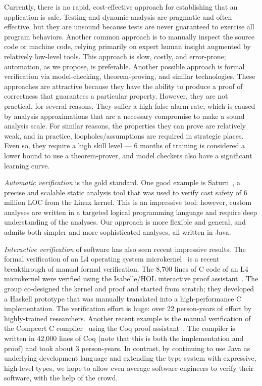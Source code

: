 \documentclass{sig-alternate}
\begin{document}
Currently, there is no rapid, cost-effective approach for establishing that
an application is safe.  Testing and dynamic analysis are pragmatic and
often effective, but they are unsound because tests are never guaranteed
to exercise all program behaviors.
Another common approach is to manually inspect the source code
or machine code, relying primarily on expert human insight augmented by
relatively low-level tools.  This approach is slow, costly, and
error-prone; automation, as we propose, is preferable.  Another possible
approach is formal verification via model-checking, theorem-proving, and
similar technologies.  These approaches are attractive because they have
the ability to produce a proof of correctness that guarantees a particular
property.  However, they are not practical, for several reasons.  They
suffer a high false alarm rate, which is caused by analysis approximations
that are a necessary compromise to make a sound analysis scale.  For
similar reasons, the properties they can prove are relatively weak, and in
practice, loopholes/assumptions are required in strategic places.  Even so, they
require a high skill level --- 6 months of training is considered a lower
bound to use a theorem-prover, and model checkers also have a significant
learning curve.


\emph{Automatic verification} is the gold standard.  One good example is
Saturn~\cite{AikenBDDHH2007}, a precise and scalable static analysis
tool that was used to verify cast safety of 6 million LOC from the Linux
kernel.
This is an impressive tool; however, custom analyses are written in a
targeted logical programming language and require deep understanding
of the analyses.
Our approach is more flexible and general, and admits both simpler and more
sophisticated analyses, all written in Java.

\emph{Interactive verification} of software has also seen recent impressive
results.
The formal verification of an L4 operating system
microkernel~\cite{Klein_EHACDEEKNSTW_10}
is a recent breakthrough of manual formal verification.
The 8,700 lines of C code of an L4 microkernel were verified using the
Isabelle/HOL interactive proof assistant~\cite{Isabelle2002}.
The group co-designed the kernel and proof and started from scratch;
they developed a Haskell prototype that was manually translated into a
high-performance C implementation.
The verification effort is huge:  over 22 person-years of effort by
highly-trained researchers.
Another recent example is the manual verification of the Compcert C
compiler~\cite{Leroy2009} using the Coq proof assistant~\cite{Coq2004}.
The compiler is written in 42,000 lines of Coq (note that this is both
the implementation and proof) and took about 3 person-years.
In contrast, by continuing to use Java as underlying development
language and extending the type system with expressive, high-level
types, we hope to allow even average software engineers to verify
their software, with the help of the crowd.
\end{document}
